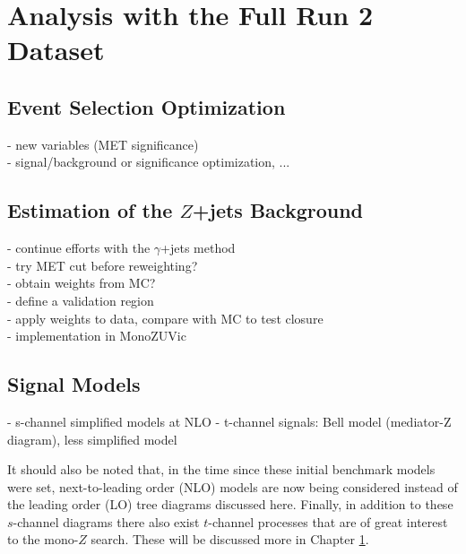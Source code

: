 \chapter{Analysis with the Full Run 2 Dataset}
\label{chapter:fullRun2}

\section{Event Selection Optimization}
- new variables (MET significance)\\
- signal/background or significance optimization, ...\\

\section{Estimation of the $Z$+jets Background}

- continue efforts with the $\gamma$+jets method\\
- try MET cut before reweighting?\\
- obtain weights from MC?\\
- define a validation region\\
- apply weights to data, compare with MC to test closure\\
- implementation in MonoZUVic\\

\section{Signal Models}
- s-channel simplified models at NLO
- t-channel signals: Bell model (mediator-Z diagram), less simplified model

It should also be noted that, in the time since these initial benchmark models were set, next-to-leading order (NLO) models are now being considered instead of the leading order (LO) tree diagrams discussed here. Finally, in addition to these $s$-channel diagrams there also exist $t$-channel processes that are of great interest to the mono-$Z$ search. These will be discussed more in Chapter \ref{chapter:fullRun2}.

